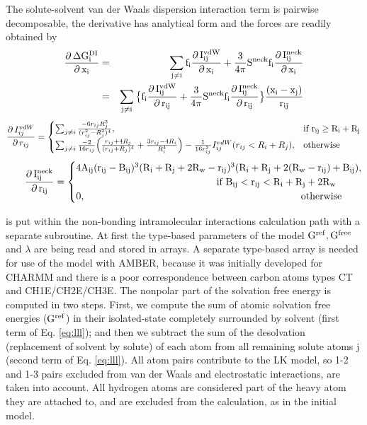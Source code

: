 \documentclass[12pt]{report}
\begin{document}
The solute-solvent van der Waals dispersion interaction term is pairwise decomposable, the derivative has analytical form and the
forces are readily obtained by
\begin{eqnarray}
\rm \frac{\partial\, \Delta G_i^{DI}}{\partial\, x_i} & = & \rm \sum_{j \not= i} f_i\frac{\partial \,I^{vdW}_{ij}}{\partial \,x_i} 
    + \frac{3}{4\pi}S^{neck}f_i \frac{\partial \,I^{neck}_{ij}}{\partial \,x_i} \nonumber \\
& = & \rm \sum_{j \not= i} \big \{f_i\frac{\partial \,I^{vdW}_{ij}}{\partial \,r_{ij}} 
  + \frac{3}{4\pi}S^{neck}f_i \frac{\partial \,I^{neck}_{ij}}{\partial \,r_{ij}}\big \} \frac{(x_i-x_j)}{r_{ij}}
\end{eqnarray}
\begin{equation}
\frac{\partial\, I_{ij}^{vdW}}{\partial\, r_{ij}} = 
\begin{cases} 
   \sum_{j\not= i}\frac{-6r_{ij}R_j^3}{(r_{ij}^2-R_j^2)^4},& \text{if } \rm r_{ij}\geq R_i + R_j\\
    \sum_{j\not= i}\frac{-2}{16r_{ij}}\Big(\frac{r_{ij}+4R_j}{(r_{ij}+R_j)^4} + \frac{3r_{ij} -4R_i}{R_i^4}  \Big) 
    - \frac{1}{16r_{ij}^2} I_{ij}^{vdW}(r_{ij}< R_i+R_j),              & \text{otherwise}
\end{cases}
\end{equation}
\begin{equation}
\rm \frac{\partial\, I_{ij}^{neck}}{\partial\, r_{ij}} = 
\begin{cases} 
\rm 4A_{ij}  (r_{ij}-B_{ij})^3(R_i + R_j + 2R_w - r_{ij})^3 (R_i+R_j+2(R_w-r_{ij})+B_{ij}) , \\   
   & \hspace{-5.5cm} \text{if } \rm B_{ij} < r_{ij} <  R_i + R_j + 2R_w  \\
 0,   & \hspace{-2.5cm} \text{otherwise} 
\end{cases}
\end{equation}

\vspace{1cm}
 is put within the non-bonding intramolecular
interactions calculation path with a separate subroutine. At first the type-based parameters of the model $\rm G^{ref}, G^{free}$
and $\lambda$ are being read and stored in arrays. A separate type-based array is needed for use of the model with AMBER,
because it was initially developed for CHARMM and there is a poor correspondence between carbon atoms types CT and CH1E/CH2E/CH3E.
The nonpolar part of the solvation free energy is computed in two steps. First, we compute the sum of atomic solvation free
energies ($\rm G^{ref}$) in their isolated-state completely surrounded by solvent   (first term of Eq. \eqref{eq:lll}); and then
we subtract the sum of the desolvation (replacement of solvent by solute) of each atom from all remaining solute atoms j (second
term of Eq. \eqref{eq:lll}). All atom pairs contribute to the LK model, so 1-2 and 1-3 pairs excluded from van der Waals and
electrostatic interactions, are taken into account. All hydrogen atoms are considered part of the heavy atom they are attached
to, and are excluded from the calculation, as in the initial model. 
\end{document}
